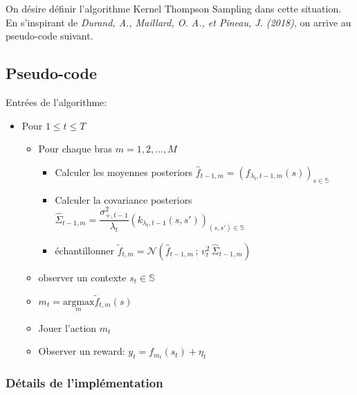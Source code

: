 \documentclass[letterpaper,11pt]{article}
\begin{document}
On désire définir l'algorithme Kernel Thompson Sampling dans cette situation. En s'inspirant de \textit{Durand, A., Maillard, O. A., et Pineau, J. (2018)}, on arrive au pseudo-code suivant.
  
\subsection{Pseudo-code}

Entrées de l'algorithme:\\

\begin{itemize}
\setlength\itemsep{0.2cm}

\item
Pour $1\leq t \leq T$ 

\begin{itemize}
\item
Pour chaque bras $m=1,2,\ldots,M$

\begin{itemize}
\item
Calculer les moyennes posteriors $\widehat{f}_{t-1,m}=(f_{\lambda_t,t-1,m}(s))_{s\in\mathbb{S}}$

\item
Calculer la covariance posteriors $\widehat{\Sigma}_{t-1,m} = \dfrac{\sigma^2_{+,t-1}}{\lambda_t}\left(k_{\lambda_t,t-1}(s,s')\right)_{(s,s')\in\mathbb{S}}$

\item
échantillonner $\widetilde{f}_{t,m}=\mathcal{N}\left(\widehat{f}_{t-1,m}\,;\,v^2_t\,\widehat{\Sigma}_{t-1,m}\right)$

\end{itemize}
\item
observer un contexte $s_t\in\mathbb{S}$

\item
$m_t = \underset{m}{\mathrm{argmax}} \tilde{f}_{t,m}(s) $

\item
Jouer l'action $m_t$

\item
Observer un reward: $y_t=f_{m_t}(s_t)+\eta_t$

\end{itemize}

\end{itemize}

\subsubsection{Détails de l'implémentation}
\end{document}
